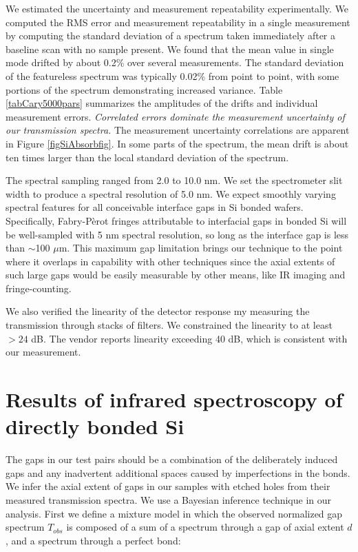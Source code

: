 We estimated the uncertainty and measurement repeatability experimentally.  We computed the RMS error and measurement repeatability in a single measurement by computing the standard deviation of a spectrum taken immediately after a baseline scan with no sample present.  We found that the mean value in single mode drifted by about 0.2\% over several measurements.  The standard deviation of the featureless spectrum was typically 0.02\% from point to point, with some portions of the spectrum demonstrating increased variance.  Table \ref{tabCary5000pars} summarizes the amplitudes of the drifts and individual measurement errors.  \emph{Correlated errors dominate the measurement uncertainty of our transmission spectra.}  The measurement uncertainty correlations are apparent in Figure \ref{figSiAbsorbfig}.  In some parts of the spectrum, the mean drift is about ten times larger than the local standard deviation of the spectrum.

The spectral sampling ranged from 2.0 to 10.0 nm.  We set the spectrometer slit width to produce a spectral resolution of 5.0 nm.  We expect smoothly varying spectral features for all conceivable interface gaps in Si bonded wafers.  Specifically, Fabry-P\`erot fringes attributable to interfacial gaps in bonded Si will be well-sampled with 5 nm spectral resolution, so long as the interface gap is less than $\sim$100 $\mu$m.  This maximum gap limitation brings our technique to the point where it overlaps in capability with other techniques since the axial extents of such large gaps would be easily measurable by other means, like IR imaging and fringe-counting.

We also verified the linearity of the detector response my measuring the transmission through stacks of filters.  We constrained the linearity to at least $>24$ dB.  The vendor reports linearity exceeding 40 dB, which is consistent with our measurement.  




\section{Results of infrared spectroscopy of directly bonded Si}
\label{secResults}

The gaps in our test pairs should be a combination of the deliberately induced gaps and any inadvertent additional spaces caused by imperfections in the bonds.  We infer the axial extent of gaps in our samples with etched holes from their measured transmission spectra.  We use a Bayesian inference technique in our analysis.  First we define a mixture model in which the observed normalized gap spectrum $T_{obs}$ is composed of a sum of a spectrum through a gap of axial extent $d$, and a spectrum through a perfect bond:

